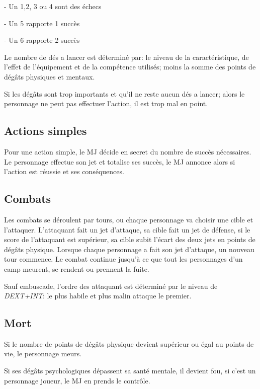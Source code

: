 \begin{landscape}
\begin{multicols}{4}
- Un 1,2, 3 ou 4 sont des échecs

- Un 5 rapporte 1 succès

- Un 6 rapporte 2 succès
	
Le nombre de dés a lancer est déterminé par: le niveau de la caractéristique, de l'effet de l'équipement et de la compétence utilisés; moins la somme des points de dégâts physiques et mentaux.

Si les dégâts sont trop importants et qu'il ne reste aucun dés a lancer; alors le personnage ne peut pas effectuer l'action, il est trop mal en point.


	
\subsection{Actions simples}

Pour une action simple, le MJ décide en secret du nombre de succès nécessaires.
Le personnage effectue son jet et totalise ses succès, le MJ annonce alors si l'action est réussie et ses conséquences. 
	

\subsection{Combats}

Les combats se déroulent par tours, ou chaque personnage va choisir une cible et l'attaquer.
L'attaquant fait un jet d'attaque, sa cible fait un jet de défense, si le score de l'attaquant est supérieur, sa cible subit l'écart des deux jets en points de dégâts physique.
Lorsque chaque personnage a fait son jet d'attaque, un nouveau tour commence.
Le combat continue jusqu'à ce que tout les personnages d'un camp meurent, se rendent ou prennent la fuite.


Sauf embuscade, l'ordre des attaquant est déterminé par le niveau de \textit{DEXT+INT}: le plus habile et plus malin attaque le premier.

\subsection{Mort}

Si le nombre de points de dégâts physique devient supérieur ou égal au points de vie, le personnage meurs.

Si ses dégâts psychologiques dépassent sa santé mentale, il devient fou, si c'est un personnage joueur, le MJ en prends le contrôle.

\vfill\null

\end{multicols}
\end{landscape}
